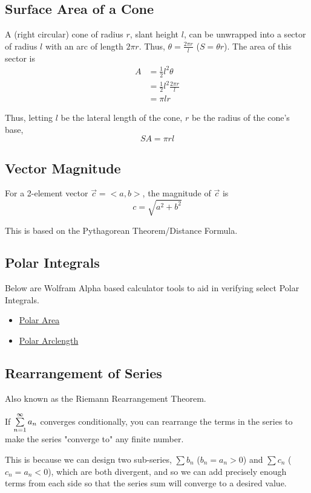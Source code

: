 \documentclass{article}
\begin{document}
\subsection{Surface Area of a Cone}
A (right circular) cone of radius $r$, slant height $l$, can be unwrapped into a sector of radius $l$ with an arc of length $2 \pi r$. Thus, $\theta = \frac{2\pi r}{l}$ ($S = \theta r$).
The area of this sector is
\begin{align*}
    A & = \frac{1}{2} l^2 \theta  \\
      & = \frac{1}{2}l^2\frac{2\pi r}{l}  \\
      & = \pi lr
\end{align*}


Thus, letting $l$ be the lateral length of the cone, $r$ be the radius of the cone's base,
$$SA = \pi rl$$

\subsection{Vector Magnitude}
For a 2-element vector $\Vec{c} = <a,b>$, the magnitude of $\Vec{c}$ is
$$c = \sqrt{a^2 + b^2}$$

This is based on the Pythagorean Theorem/Distance Formula.

\subsection{Polar Integrals}
Below are Wolfram Alpha based calculator tools to aid in verifying select Polar Integrals.

\begin{itemize}
    \item \href{https://www.wolframalpha.com/widgets/view.jsp?id=769788ade06411e063edbd51239787f9}{Polar Area}
    \item \href{https://www.wolframalpha.com/widgets/view.jsp?id=c26cbb9457ff75f58f479364ddb79cd1}{Polar Arclength}
\end{itemize}

\subsection{Rearrangement of Series}
Also known as the Riemann Rearrangement Theorem.

If $\sum_{n=1}^{\infty}\limits a_n$ converges conditionally, you can rearrange the terms in the series to make the series "converge to" any finite number.

This is because we can design two sub-series, $\sum b_n$ ($b_n = a_n > 0$) and $\sum c_n$ ($c_n = a_n < 0$), which are both divergent, and so we can add precisely enough terms from each side so that the series sum will converge to a desired value.
\end{document}

